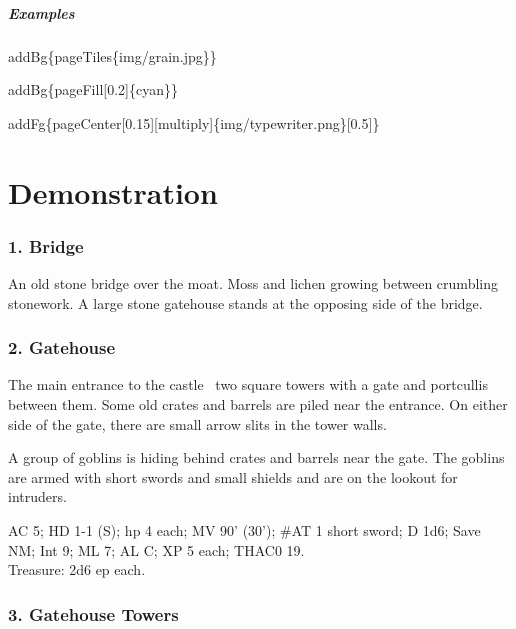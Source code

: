 \documentclass[english,12pt,openany,letterpaper]{book}
\begin{document}
\skipline

\paragraph{Examples}

\bs addBg\{\bs pageTiles\{img/grain.jpg\}\}

\bs addBg\{\bs pageFill[0.2]\{cyan\}\}

\bs addFg\{\bs pageCenter[0.15][multiply]\{img/typewriter.png\}[0.5]\}



\twocolumn

\clearFg

\chapter{Demonstration}

\subsection{1. Bridge}

An old stone bridge over the moat. Moss and lichen growing between crumbling stonework. A large stone gatehouse stands at the opposing side of the bridge.

\subsection{2. Gatehouse}

The main entrance to the castle \dash\ two square towers with a gate and portcullis between them. Some old crates and barrels are piled near the entrance. On either side of the gate, there are small arrow slits in the tower walls.

\tab A group of goblins is hiding behind crates and barrels near the gate. The goblins are armed with short swords and small shields and are on the lookout for intruders.


AC 5; HD 1-1 (S); hp 4 each; MV 90' (30'); \#AT 1 short sword; D 1d6; Save NM; Int 9; ML 7; AL C; XP 5 each; THAC0 19.
\\Treasure: 2d6 ep each.

\subsection{3. Gatehouse Towers}
\end{document}
